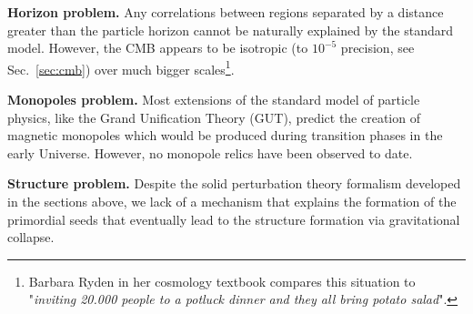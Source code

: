 \textbf{Horizon problem.} Any correlations between regions separated by a distance greater than the particle 
horizon cannot be naturally explained by the standard model. However, the \gls{CMB} appears to be 
isotropic (to $10^{-5}$ precision, see Sec.~\eqref{sec:cmb}) over much bigger scales\footnote{Barbara
Ryden in her cosmology textbook \citep{Ryden2003} compares this situation to "\emph{inviting 20.000 people to a potluck
dinner and they all bring potato salad}".}.

\textbf{Monopoles problem.} Most extensions of the standard model of particle physics, like the Grand
Unification Theory (GUT), predict the creation of magnetic monopoles which would be produced during
transition phases in the early Universe. However, no monopole relics have been observed to date.

\textbf{Structure problem.} Despite the solid perturbation theory formalism developed in the sections above,
we lack of a mechanism that explains the formation of the primordial seeds that eventually lead to the 
structure formation via gravitational collapse.


